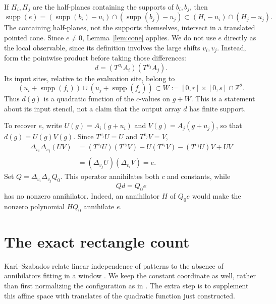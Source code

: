 \documentclass[11pt]{article}
\numberwithin{equation}{section}
\theoremstyle{definition}
\theoremstyle{remark}
\newcommand{\Z}{\mathbb Z}
\newcommand{\supp}{\operatorname{supp}}
\newcommand{\Del}[1]{\Delta_{#1}}
\begin{document}
If $H_i,H_j$ are the half-planes containing the supports of $b_i,b_j$, then
\[
 \supp(e)=(\supp(b_i)-u_i)\cap(\supp(b_j)-u_j)
       \subset (H_i-u_i)\cap(H_j-u_j).
\]
The containing half-planes, not the supports themselves, intersect in a translated pointed cone.
Since $e\ne0$, Lemma~\ref{lem:cone} applies. We do not use $e$ directly as the local observable,
since its definition involves the large shifts $v_i,v_j$. Instead, form the pointwise product before
taking those differences:
\[
 d=(T^{u_i}A_i)(T^{u_j}A_j).
\]
Its input sites, relative to the evaluation site, belong to
\begin{equation}\label{eq:observable-stencil}
 (u_i+\supp(f_i))\cup(u_j+\supp(f_j))
       \subset W:=[0,r]\times[0,s]\cap\Z^2.
\end{equation}
Thus $d(g)$ is a quadratic function of the $c$-values on $g+W$. This is a statement about its
input stencil, not a claim that the output array $d$ has finite support.

To recover $e$, write $U(g)=A_i(g+u_i)$ and $V(g)=A_j(g+u_j)$, so that $d(g)=U(g)V(g)$.
Since $T^{v_i}U=U$ and $T^{v_j}V=V$,
\begin{align*}
 \Del{v_i}\Del{v_j}(UV)
 &= (T^{v_j}U)(T^{v_i}V)-U(T^{v_i}V)-(T^{v_j}U)V+UV\\
 &= (\Del{v_j}U)(\Del{v_i}V)=e.
\end{align*}
Set $Q=\Del{v_i}\Del{v_j}Q_0$. This operator annihilates both $c$ and constants, while
\begin{equation}\label{eq:Qd}
 Qd=Q_0e
\end{equation}
has no nonzero annihilator. Indeed, an annihilator $H$ of $Q_0e$ would make the nonzero polynomial
$HQ_0$ annihilate $e$.

\section{The exact rectangle count}\label{sec:count}
Kari--Szabados relate linear independence of patterns to the absence of annihilators fitting in a
window \cite[Lemma~36]{KS}. We keep the constant coordinate as well, rather than first normalizing
the configuration as in \cite[Lemma~33]{KS}. The extra step is to supplement this affine space
with translates of the quadratic function just constructed.
\end{document}
